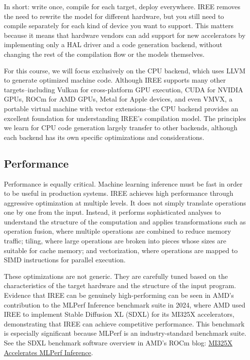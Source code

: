 \documentclass[11pt,a4paper]{article}
\begin{document}
In short: write once, compile for each target, deploy everywhere. IREE removes the need to rewrite the model for different hardware, but you still need to compile separately for each kind of device you want to support. This matters because it means that hardware vendors can add support for new accelerators by implementing only a HAL driver and a code generation backend, without changing the rest of the compilation flow or the models themselves.

For this course, we will focus exclusively on the CPU backend, which uses LLVM to generate optimized machine code. Although IREE supports many other targets--including Vulkan for cross-platform GPU execution, CUDA for NVIDIA GPUs, ROCm for AMD GPUs, Metal for Apple devices, and even VMVX, a portable virtual machine with vector extensions--the CPU backend provides an excellent foundation for understanding IREE's compilation model. The principles we learn for CPU code generation largely transfer to other backends, although each backend has its own specific optimizations and considerations.

\subsection{Performance}

Performance is equally critical. Machine learning inference must be fast in order to be useful in production systems. IREE achieves high performance through aggressive optimization at multiple levels. It does not simply translate operations one by one from the input. Instead, it performs sophisticated analyses to understand the structure of the computation and applies transformations such as operation fusion, where multiple operations are combined to reduce memory traffic; tiling, where large operations are broken into pieces whose sizes are suitable for cache memory; and vectorization, where operations are mapped to SIMD instructions for parallel execution.

These optimizations are not generic. They are carefully tuned based on the characteristics of the target hardware and the structure of the input program. Evidence that IREE can be genuinely high-performing can be seen in AMD's contribution to the MLPerf Inference benchmark suite in 2024, where AMD used IREE to implement Stable Diffusion XL (SDXL) for its MI325X accelerators, demonstrating that IREE can achieve competitive performance. This benchmark is especially significant because MLPerf is an industry-standard benchmark suite. See the SDXL benchmark software overview in AMD's ROCm blog: \href{https://rocm.blogs.amd.com/artificial-intelligence/mi325x-accelerates-mlperf-inference/README.html#sdxl-benchmark-software-overview}{MI325X Accelerates MLPerf Inference}.
\end{document}
